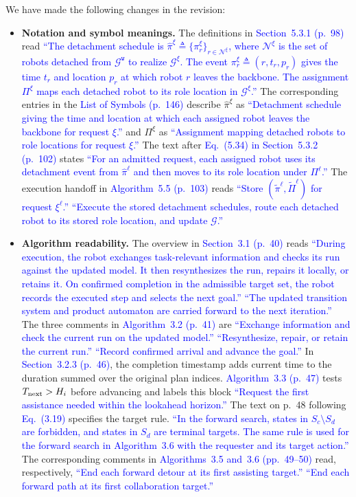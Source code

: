 \documentclass[11pt]{article}
\newcommand{\change}[1]{\textcolor{blue}{#1}}
\begin{document}
We have made the following changes in the revision:
\begin{itemize}
\item \textbf{Notation and symbol meanings.} The definitions in
\change{Section~5.3.1 (p.~98)} read
\change{``The detachment schedule is \(\widehat{\pi}^{\xi}\triangleq
\{\pi_r^{\xi}\}_{r\in\mathcal{N}^{\xi}}\),
where \(\mathcal{N}^{\xi}\) is the set of robots detached from
\(\mathcal{G}^{\texttt{w}}\) to realize \(\mathcal{G}^{\xi}\).
The event \(\pi_r^{\xi}\triangleq(r,t_r,p_r)\) gives the time \(t_r\) and
location \(p_r\) at which robot \(r\) leaves the backbone.
The assignment \(\Pi^{\xi}\) maps each detached robot to its role location
in \(\mathcal{G}^{\xi}\).''}
The corresponding entries in the \change{List of Symbols (p.~146)} describe
$\widehat{\pi}^{\xi}$ as
\change{``Detachment schedule giving the time and location at which each assigned robot
leaves the backbone for request $\xi$.''}
and $\Pi^{\xi}$ as
\change{``Assignment mapping detached robots to role locations for request $\xi$.''}
The text after \change{Eq.~(5.34) in Section~5.3.2 (p.~102)} states
\change{``For an admitted request, each assigned robot uses its detachment event from
\(\widehat{\pi}^{\ell}\) and then moves to its role location under
\(\Pi^{\ell}\).''}
The execution handoff in \change{Algorithm~5.5 (p.~103)} reads
\change{``Store \((\widetilde{\pi}^{\ell},\widetilde{\Pi}^{\ell})\)
            for request \(\xi^{\ell}\).''}
\change{``Execute the stored detachment schedules, route each detached robot
      to its stored role location, and update \(\mathcal{G}\).''}

\item \textbf{Algorithm readability.} The overview in \change{Section~3.1
(p.~40)} reads
\change{``During execution, the robot exchanges task-relevant information and checks
its run against the updated model. It then resynthesizes the run, repairs it
locally, or retains it. On confirmed completion in the admissible target set,
the robot records the executed step and selects the next goal.''}
\change{``The updated transition system and product automaton are carried forward
to the next iteration.''}
The three comments in \change{Algorithm~3.2 (p.~41)} are
\change{``Exchange information and check the current run on the updated model.''}
\change{``Resynthesize, repair, or retain the current run.''}
\change{``Record confirmed arrival and advance the goal.''}
In \change{Section~3.2.3 (p.~46)}, the completion timestamp adds current time
to the duration summed over the original plan indices.
\change{Algorithm~3.3 (p.~47)} tests $T_{\textup{next}}>H_i$
before advancing and labels this block
\change{``Request the first assistance needed within the lookahead horizon.''}
The text on p.~48 following \change{Eq.~(3.19)} specifies the target rule.
\change{``In the forward search, states in $S_c\setminus S_d$ are forbidden, and states
in $S_d$ are terminal targets. The same rule is used for the forward search
in Algorithm~3.6 with the requester and its target action.''}
The corresponding comments in \change{Algorithms~3.5 and~3.6
(pp.~49--50)} read, respectively,
\change{``End each forward detour at its first assisting target.''}
\change{``End each forward path at its first collaboration target.''}


\end{itemize}
\end{document}

